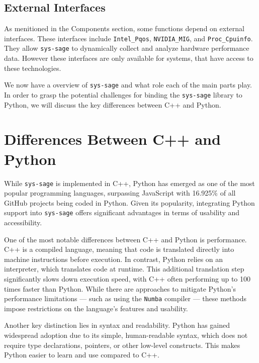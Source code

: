 \subsection{External Interfaces}

As menitioned in the Components section, some functions depend on external interfaces. These interfaces include \texttt{Intel\_Pqos}, \texttt{NVIDIA\_MIG}, and \texttt{Proc\_Cpuinfo}. They allow \texttt{sys-sage} to dynamically collect and analyze hardware performance data. However these interfaces are only available for systems, that have access to these technologies.\cite{sys-sage-docu}

We now have a overview of \texttt{sys-sage} and what role each of the main parts play. In order to grasp the potential challenges for binding the \texttt{sys-sage} library to Python, we will discuss the key differences between C++ and Python.

\section{Differences Between C++ and Python}

While \texttt{sys-sage} is implemented in C++, Python has emerged as one of the most popular programming languages, surpassing JavaScript with 16.925\% of all GitHub projects being coded in Python. Given its popularity, integrating Python support into \texttt{sys-sage} offers significant advantages in terms of usability and accessibility. \cite{languages-github-stats}

One of the most notable differences between C++ and Python is performance. C++ is a compiled language, meaning that code is translated directly into machine instructions before execution. In contrast, Python relies on an interpreter, which translates code at runtime. This additional translation step significantly slows down execution speed, with C++ often performing up to 100 times faster than Python. While there are approaches to mitigate Python's performance limitations — such as using the \texttt{Numba} compiler\parencite{numba} — these methods impose restrictions on the language’s features and usability.\cite{languages-performance}

Another key distinction lies in syntax and readability. Python has gained widespread adoption due to its simple, human-readable syntax, which does not require type declarations, pointers, or other low-level constructs. This makes Python easier to learn and use compared to C++.

